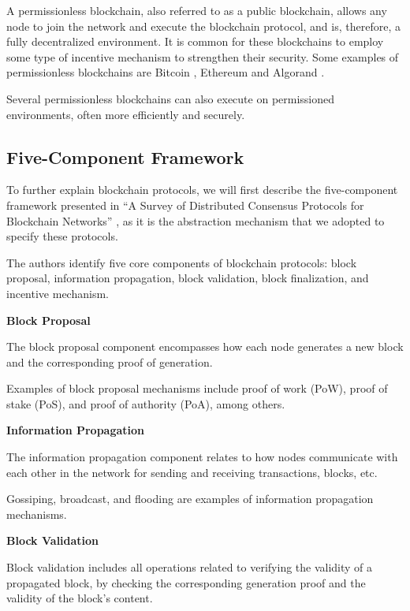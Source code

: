 A permissionless blockchain, also referred to as a public blockchain, allows any node to join the network and execute the blockchain protocol, and is, therefore, a fully decentralized environment. It is common for these blockchains to employ some type of incentive mechanism to strengthen their security. Some examples of permissionless blockchains are Bitcoin \cite{bitcoin}, Ethereum \cite{ethereum_whitepaper} and Algorand \cite{algorand_scale_byz_agreements}.

Several permissionless blockchains can also execute on permissioned environments, often more efficiently and securely.

\subsection{Five-Component Framework}

To further explain blockchain protocols, we will first describe the five-component framework presented in “A Survey of Distributed Consensus Protocols for Blockchain Networks” \cite{survey_bchain_networks}, as it is the abstraction mechanism that we adopted to specify these protocols.

The authors identify five core components of blockchain protocols: block proposal, information propagation, block validation, block finalization, and incentive mechanism.

\vspace{0.5cm}

\textbf{Block Proposal}

The block proposal component encompasses how each node generates a new block and the corresponding proof of generation.

Examples of block proposal mechanisms include proof of work (PoW), proof of stake (PoS), and proof of authority (PoA), among others.

\vspace{0.25cm}


\textbf{Information Propagation}

The information propagation component relates to how nodes communicate with each other in the network for sending and receiving transactions, blocks, etc.

Gossiping, broadcast, and flooding are examples of information propagation mechanisms.

\vspace{0.25cm}

\textbf{Block Validation}

Block validation includes all operations related to verifying the validity of a propagated block, by checking the corresponding generation proof and the validity of the block’s content.

